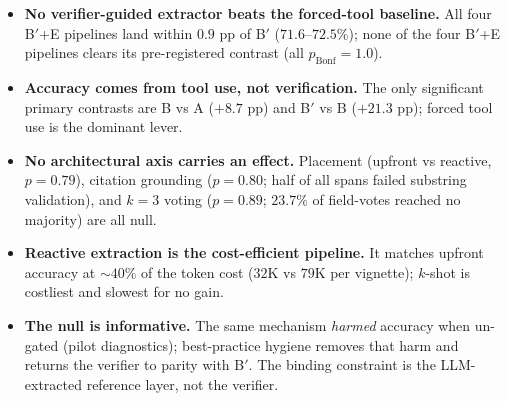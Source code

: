 
\begin{itemize}\setlength\itemsep{3pt}
  \item \textbf{No verifier-guided extractor beats the forced-tool
        baseline.} All four B$'$+E pipelines land within $0.9$ pp of
        B$'$ ($71.6$--$72.5\%$); none of the four B$'$+E pipelines
        clears its pre-registered contrast (all $p_{\text{Bonf}} = 1.0$).
  \item \textbf{Accuracy comes from tool use, not verification.} The
        only significant primary contrasts are B vs A ($+8.7$ pp) and
        B$'$ vs B ($+21.3$ pp); forced tool use is the dominant lever.
  \item \textbf{No architectural axis carries an effect.} Placement
        (upfront vs reactive, $p = 0.79$), citation grounding
        ($p = 0.80$; half of all spans failed substring validation),
        and $k=3$ voting ($p = 0.89$; $23.7\%$ of field-votes reached
        no majority) are all null.
  \item \textbf{Reactive extraction is the cost-efficient pipeline.}
        It matches upfront accuracy at $\sim$$40\%$ of the token cost
        ($32$K vs $79$K per vignette); $k$-shot is costliest and
        slowest for no gain.
  \item \textbf{The null is informative.} The same mechanism
        \emph{harmed} accuracy when un-gated (pilot diagnostics);
        best-practice hygiene removes that harm and returns the
        verifier to parity with B$'$. The binding constraint is the
        LLM-extracted reference layer, not the verifier.
\end{itemize}
